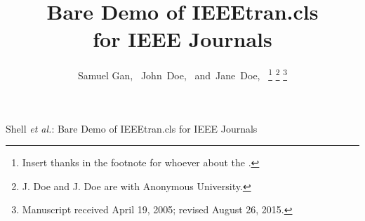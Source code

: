 \documentclass[journal]{IEEEtran}
\begin{document}
%
\title{Bare Demo of IEEEtran.cls\\ for IEEE Journals}
%
%
%

\author{Samuel Gan,~
    John~Doe,~
    and~Jane~Doe,~%
    \thanks{Insert thanks in the footnote for whoever about the .}%
    \thanks{J. Doe and J. Doe are with Anonymous University.}%
    \thanks{Manuscript received April 19, 2005; revised August 26, 2015.}}

% 
%



%
{Shell \MakeLowercase{\textit{et al.}}: Bare Demo of IEEEtran.cls for IEEE Journals}
% 
\end{document}
